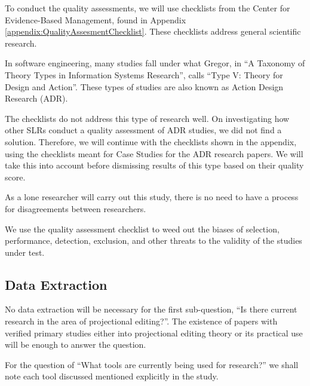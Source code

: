 To conduct the quality assessments, we will use checklists from the Center for Evidence-Based Management, found in Appendix \ref{appendix:QualityAssesmentChecklist}.
These checklists address general scientific research.

In software engineering, many studies fall under what Gregor\cite{gregor2006nature}, in ``A Taxonomy of Theory Types in Information Systems Research'', calls ``Type V: Theory for Design and Action''.
These types of studies are also known as Action Design Research (ADR).

The checklists do not address this type of research well.
On investigating how other SLRs conduct a quality assessment of ADR studies, we did not find a solution.
Therefore, we will continue with the checklists shown in the appendix, using the checklists meant for Case Studies for the ADR research papers.
We will take this into account before dismissing results of this type based on their quality score.

As a lone researcher will carry out this study, there is no need to have a process for disagreements between researchers.

We use the quality assessment checklist to weed out the biases of selection, performance, detection, exclusion, and other threats to the validity of the studies under test.


\subsection{Data Extraction}
\label{section:dataExtraction}
No data extraction will be necessary for the first sub-question,  ``Is there current research in the area of projectional editing?''.
The existence of papers with verified primary studies either into projectional editing theory or its practical use will be enough to answer the question.

For the question of ``What tools are currently being used for research?'' we shall note each tool discussed mentioned explicitly in the study.

